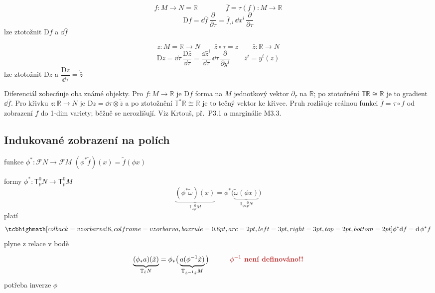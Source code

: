 \begin{priklad}[funkce na $M$]
\[
  f: M\to N = \mathbb{R} \qquad\qquad \bar f = \tau(f): M\to\mathbb{R}
\]
\[
  \mathrm{D}f = \dd\bar f\,\frac{\partial}{\partial\tau} = \bar f_{,i}\,\dd x^i\,\frac{\partial}{\partial\tau}
\]
\quad lze ztotožnit $\mathrm{D}f$ a $\dd\bar f$
\end{priklad}

\begin{priklad}[křivka v $N$]
\[
  z: M = \mathbb{R}\to N \qquad \bar z\circ\tau = z \qquad \bar z: \mathbb{R}\to N
\]
\[
  \mathrm{D}z = \dd\tau\,\frac{\mathrm{D}\bar z}{\dd\tau} = \frac{\dd\bar z^i}{\dd\tau}\,\dd\tau\,\frac{\partial}{\partial y^i}
  \qquad \bar z^i = y^i(z)
\]
\quad lze ztotožnit $\mathrm{D}z$ a $\dfrac{\mathrm{D}\bar z}{\dd\tau} = \dot{\bar z}$
\end{priklad}

\begin{vysvetleni}
Diferenciál zobecňuje oba známé objekty. Pro $f:M\to\mathbb R$ je $\mathrm Df$ forma na $M$  jednotkový vektor $\partial_\tau$ na $\mathbb R$; po ztotožnění $\mathbb T\mathbb R\cong\mathbb R$ je to gradient $\dd\bar f$. Pro křivku $z:\mathbb R\to N$ je $\mathrm Dz=\dd\tau\otimes\dot{\bar z}$ a po ztotožnění $\mathbb T^*\mathbb R\cong\mathbb R$ je to tečný vektor ke křivce. Pruh rozlišuje reálnou funkci $\bar f=\tau\circ f$ od zobrazení $f$ do 1-dim variety; běžně se nerozlišují. Viz Krtouš, př.\ P3.1 a marginálie M3.3.
\end{vysvetleni}

\subsection{Indukované zobrazení na polích}

funkce \qquad $\phi^*: \mathcal{F}N\to\mathcal{F}M$ \qquad $(\phi^*\tilde f)(x) = \tilde f(\phi x)$

formy \qquad $\phi^*: \mathsf{T}^0_pN\to\mathsf{T}^0_pM$
\[
  \underbrace{(\phi^*\tilde\omega)(x)}_{\mathbb{T}_x{}^0_pM} = \phi^*\big(\underbrace{\tilde\omega(\phi x)}_{\mathbb{T}_{\phi x}{}^0_pN}\big)
\]
platí
\[
  \vzorec{\phi^*\dd f = \dd\,\phi^*f}
\]
\quad plyne z relace v bodě

\[
  \underbrace{(\phi_*a)(\tilde x)}_{\mathbb{T}_{\tilde x}N} = \phi_*\big(\underbrace{a(\phi^{-1}\tilde x)}_{\mathbb{T}_{\phi^{-1}\tilde x}M}\big)
  \qquad\quad \text{\pozor{$\phi^{-1}$ není definováno!!}}
\]
\quad potřeba inverze $\phi$

